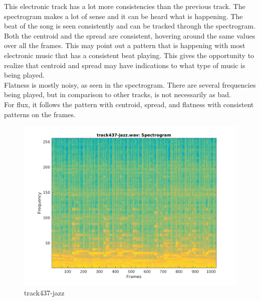 \documentclass[11pt, a4paper]{article}
\begin{document}
\pagebreak

This electronic track has a lot more consistencies than the previous track. The spectrogram makes a lot of sense and it can be heard what is happening. The beat of the song is seen consistently and can be tracked through the spectrogram. \\

Both the centroid and the spread are consistent, hovering around the same values over all the frames. This may point out a pattern that is happening with most electronic music that has a consistent beat playing. This gives the opportunity to realize that centroid and spread may have indications to what type of music is being played. \\

Flatness is mostly noisy, as seen in the spectrogram. There are several frequencies being played, but in comparison to other tracks, is not necessarily as bad. \\

For flux, it follows the pattern with centroid, spread, and flatness with consistent patterns on the frames. 

\pagebreak

\begin{figure}[H]
    \centering
    \includegraphics[width=.75\textwidth]{track437-jazz-specto.png}
    \caption{track437-jazz}
\end{figure}
\end{document}
